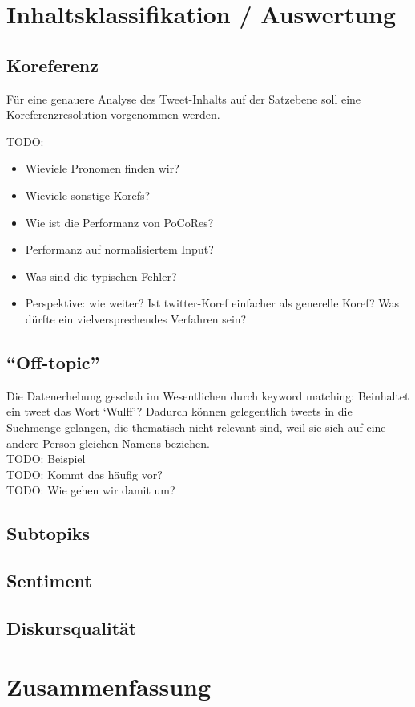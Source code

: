 \documentclass[11pt]{article}
\begin{document}
\section{Inhaltsklassifikation / Auswertung}

\subsection{Koreferenz}
Für eine genauere Analyse des Tweet-Inhalts auf der Satzebene soll
eine Koreferenzresolution vorgenommen werden.

TODO:
\begin{itemize}
\item Wieviele Pronomen finden wir?
\item Wieviele sonstige Korefs?
\item Wie ist die Performanz von PoCoRes?
\item Performanz auf normalisiertem Input?
\item Was sind die typischen Fehler?
\item Perspektive: wie weiter? Ist twitter-Koref einfacher als
  generelle Koref? Was dürfte ein vielversprechendes Verfahren sein?
\end{itemize}

\subsection{``Off-topic''}
Die Datenerhebung geschah im Wesentlichen durch keyword matching:
Beinhaltet ein tweet das Wort `Wulff'? Dadurch können gelegentlich
tweets in die Suchmenge gelangen, die thematisch nicht relevant sind,
weil sie sich auf eine andere Person gleichen Namens beziehen.\\
TODO: Beispiel\\
TODO: Kommt das häufig vor?\\
TODO: Wie gehen wir damit um?

\subsection{Subtopiks}

\subsection{Sentiment}

\subsection{Diskursqualität}

\section{Zusammenfassung}






\begin{small}

\end{small}
\end{document}
